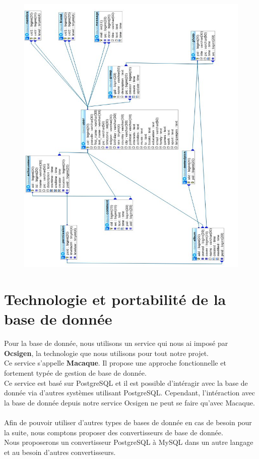 \documentclass{life-fr}
\begin{document}
\begin{figure}[H]
  \begin{center}
    \includegraphics[width=18cm]{img/imgdb.jpg}
  \end{center}
\end{figure}

\section{Technologie et portabilité de la base de donnée}

Pour la base de donnée, nous utilisons un service qui nous ai imposé par
\textbf{Ocsigen}, la technologie que nous utilisons pour tout notre projet.\\
Ce service s'appelle \textbf{Macaque}. Il propose une approche fonctionnelle
et fortement typée de gestion de base de donnée.\\
Ce service est basé sur PostgreSQL et il est possible d'intéragir avec la
base de donnée via d'autres systèmes utilisant PostgreSQL.
Cependant, l'intéraction avec la base de donnée depuis notre service Ocsigen
ne peut se faire qu'avec Macaque.\\
\\
Afin de pouvoir utiliser d'autres types de bases de donnée en cas de besoin
pour la suite, nous comptons proposer des convertisseurs de base de donnée.\\
Nous proposerons un convertisseur PostgreSQL à MySQL dans un autre langage et
au besoin d'autres convertisseurs.
\end{document}
